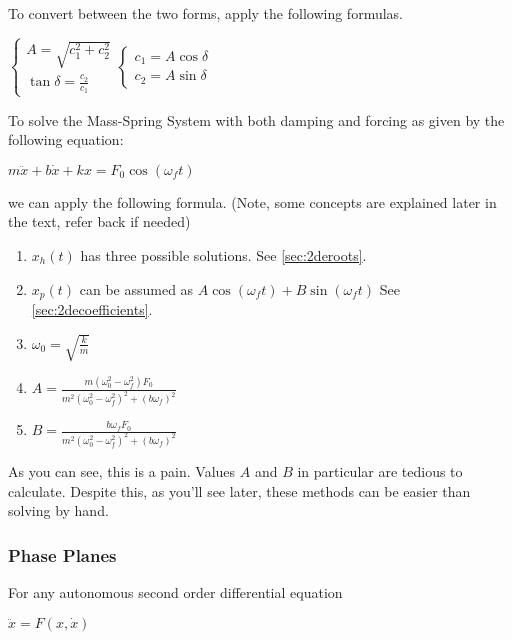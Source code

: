 \documentclass[12pt,landscape,twocolumn]{article}
\begin{document}
        To convert between the two forms, apply the following formulas.

            $
                \begin{cases}
                    A = \sqrt{c_1^2 + c_2^2}\\
                    \tan \delta = \frac{c_2}{c_1}
                \end{cases}
                \begin{cases}
                    c_1 = A \cos \delta\\
                    c_2 = A \sin \delta
                \end{cases}
            $

        To solve the Mass-Spring System with both damping and forcing as given by the following equation:

            $
                m \ddot{x} + b\dot{x} + kx = F_0 \cos ( \omega_f t )
            $

        we can apply the following formula. (Note, some concepts are explained later in the text, refer back if needed)

        \begin{enumerate}
            \item $x_h(t)$ has three possible solutions. See \eqref{sec:2deroots}.
            \item $x_p(t)$ can be assumed as
                $ A \cos ( \omega_f t ) + B \sin ( \omega_f t )$
                See \eqref{sec:2decoefficients}.
            \item $ \omega_0 = \sqrt{\frac{k}{m} } $
            \item $ A = \frac{m (\omega_0^2 - \omega_f^2) F_0}{m^2{(\omega_0^2 - \omega_f^2)}^2 + {(b \omega_f)}^2} $
            \item $ B = \frac{b \omega_f F_0}{m^2{(\omega_0^2 - \omega_f^2)}^2 + {(b \omega_f)}^2} $
        \end{enumerate}

        As you can see, this is a pain. Values $A$ and $B$ in particular are tedious to calculate. Despite this, as you'll see later, these methods can be easier than solving by hand.

        \subsubsection{Phase Planes}\label{sec:2depplane}
        For any autonomous second order differential equation

            $ \ddot{x} = F(x, \dot{x}) $
\end{document}
